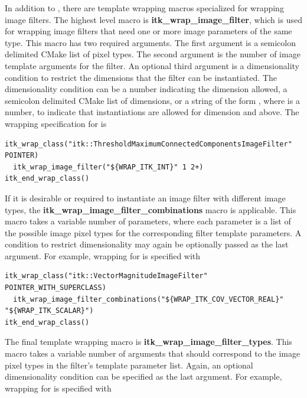 In addition to , there are template wrapping macros
specialized for wrapping image filters. The highest level macro is
\textbf{itk\_wrap\_image\_filter}, which is used for wrapping image filters
that need one or more image parameters of the same type. This macro has two
required arguments. The first argument is a semicolon delimited CMake list of
pixel types. The second argument is the number of image template arguments for
the filter. An optional third argument is a dimensionality condition to
restrict the dimensions that the filter can be instantiated. The
dimensionality condition can be a number indicating the dimension
allowed, a semicolon delimited CMake list of dimensions, or a string of the
form , where  is a number, to indicate that instantiations
are allowed for dimension  and above. The wrapping specification for
 is

\begin{verbatim}
itk_wrap_class("itk::ThresholdMaximumConnectedComponentsImageFilter" POINTER)
  itk_wrap_image_filter("${WRAP_ITK_INT}" 1 2+)
itk_end_wrap_class()
\end{verbatim}

If it is desirable or required to instantiate an image filter with different
image types, the \textbf{itk\_wrap\_image\_filter\_combinations} macro is
applicable. This macro takes a variable number of parameters, where each
parameter is a list of the possible image pixel types for the corresponding
filter
template parameters. A condition to restrict dimensionality may again be
optionally passed as the last argument. For example, wrapping for
 is specified with

\begin{verbatim}
itk_wrap_class("itk::VectorMagnitudeImageFilter" POINTER_WITH_SUPERCLASS)
  itk_wrap_image_filter_combinations("${WRAP_ITK_COV_VECTOR_REAL}" "${WRAP_ITK_SCALAR}")
itk_end_wrap_class()
\end{verbatim}

The final template wrapping macro is \textbf{itk\_wrap\_image\_filter\_types}.
This macro takes a variable number of arguments that should correspond to the
image pixel types in the filter's template parameter list. Again, an optional
dimensionality condition can be specified as the last argument. For example,
wrapping for  is specified with

